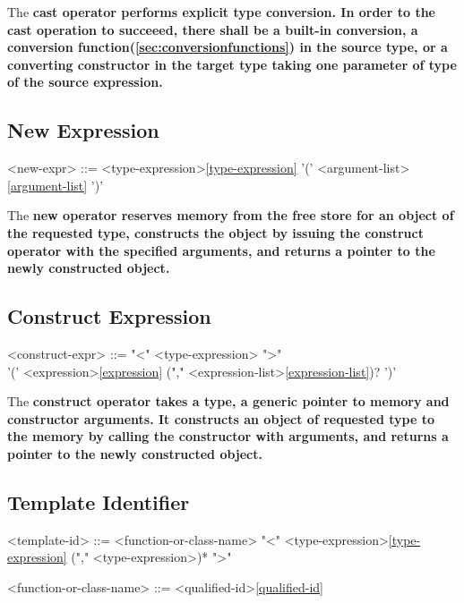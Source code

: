 \documentclass[a4paper,oneside,11pt]{article}
\begin{document}
The \bf{cast} operator performs explicit type conversion.
In order to the cast operation to succeeed, there shall be a built-in conversion, a conversion function(\ref{sec:conversionfunctions}) in the source type,
or a converting constructor in the target type taking one parameter of type of the source expression.

\subsection{New Expression}

\begin{grammar}
\label{new-expr}<new-expr> ::=  <type-expression>\ref{type-expression} '(' <argument-list>\ref{argument-list} ')'
\end{grammar}

The \bf{new} operator reserves memory from the free store for an object of the requested type,
constructs the object by issuing the \bf{construct} operator with the specified arguments,
and returns a pointer to the newly constructed object.

\subsection{Construct Expression}

\begin{grammar}
\label{construct-expr}<construct-expr> ::=  "<" <type-expression> ">"\\
'(' <expression>\ref{expression} ("," <expression-list>\ref{expression-list})? ')'

\end{grammar}

The \bf{construct} operator takes a type, a generic pointer to memory and constructor arguments.
It constructs an object of requested type to the memory by calling the constructor with arguments,
and returns a pointer to the newly constructed object.

\subsection{Template Identifier}\label{sec:templateid}
\begin{grammar}
\label{template-id}<template-id> ::= <function-or-class-name> "<" <type-expression>\ref{type-expression} ("," <type-expression>)* ">"

<function-or-class-name> ::= <qualified-id>\ref{qualified-id}
\end{grammar}
\end{document}

